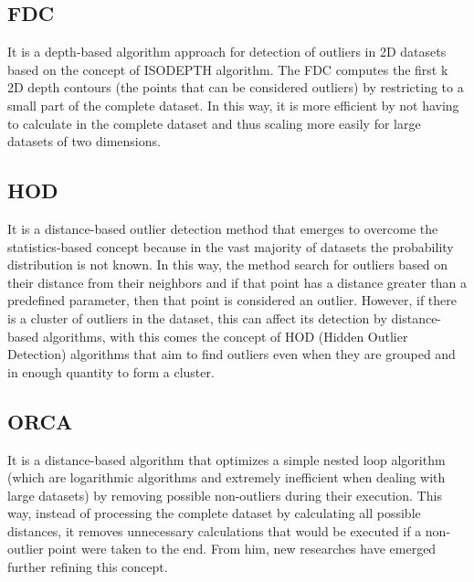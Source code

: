 

\subsection{FDC}

It is a depth-based algorithm \cite{Johnson:1998:FCD:3000292.3000332} approach for detection of outliers in 2D datasets based on the concept of ISODEPTH algorithm. The FDC computes the first k 2D depth contours (the points that can be considered outliers) by restricting to a small part of the complete dataset. In this way, it is more efficient by not having to calculate in the complete dataset and thus scaling more easily for large datasets of two dimensions.

\subsection{HOD}

It is a distance-based outlier detection method \cite{Xu2016} that emerges to overcome the statistics-based
concept because in the vast majority of datasets the probability distribution is not known.
In this way, the method search for outliers based on their distance from their neighbors
and if that point has a distance greater than a predefined parameter, then that point is
considered an outlier. However, if there is a cluster of outliers in the dataset, this
can affect its detection by distance-based algorithms, with this comes the concept of HOD
(Hidden Outlier Detection) algorithms that aim to find outliers even when they are grouped
and in enough quantity to form a cluster.



\subsection{ORCA}

It is a distance-based algorithm \cite{Bay:2003:MDO:956750.956758} that optimizes a simple nested loop algorithm (which are logarithmic algorithms and extremely inefficient when dealing with large datasets) by removing possible non-outliers during their execution. This way, instead of processing the complete dataset by calculating all possible distances, it removes unnecessary calculations that would be executed if a non-outlier point were taken to the end. From him, new researches have emerged further refining this concept.

